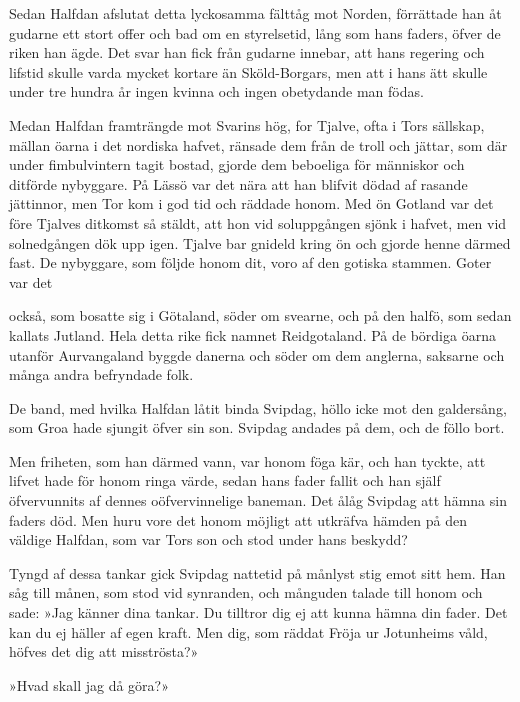 Sedan Halfdan afslutat detta lyckosamma fälttåg mot Norden, förrättade
han åt gudarne ett stort offer och bad om en styrelsetid, lång som hans
faders, öfver de riken han ägde. Det svar han fick från gudarne innebar,
att hans regering och lifstid skulle varda mycket kortare än
Sköld-Borgars, men att i hans ätt skulle under tre hundra år ingen
kvinna och ingen obetydande man födas.

Medan Halfdan framträngde mot Svarins hög, for Tjalve, ofta i Tors
sällskap, mällan öarna i det nordiska hafvet, ränsade dem från de troll
och jättar, som där under fimbulvintern tagit bostad, gjorde dem
beboeliga för människor och ditförde nybyggare. På Lässö var det nära
att han blifvit dödad af rasande jättinnor, men Tor kom i god tid och
räddade honom. Med ön Gotland var det före Tjalves ditkomst så stäldt,
att hon vid soluppgången sjönk i hafvet, men vid solnedgången dök upp
igen. Tjalve bar gnideld kring ön och gjorde henne därmed fast. De
nybyggare, som följde honom dit, voro af den gotiska stammen. Goter var
det

också, som bosatte sig i Götaland, söder om svearne, och på den halfö,
som sedan kallats Jutland. Hela detta rike fick namnet Reidgotaland. På
de bördiga öarna utanför Aurvangaland byggde danerna och söder om dem
anglerna, saksarne och många andra befryndade folk.



De band, med hvilka Halfdan låtit binda Svipdag, höllo icke mot den
galdersång, som Groa hade sjungit öfver sin son. Svipdag andades på dem,
och de föllo bort.

Men friheten, som han därmed vann, var honom föga kär, och han tyckte,
att lifvet hade för honom ringa värde, sedan hans fader fallit och han
själf öfvervunnits af dennes oöfvervinnelige baneman. Det ålåg Svipdag
att hämna sin faders död. Men huru vore det honom möjligt att utkräfva
hämden på den väldige Halfdan, som var Tors son och stod under hans
beskydd?

Tyngd af dessa tankar gick Svipdag nattetid på månlyst stig emot sitt
hem. Han såg till månen, som stod vid synranden, och månguden talade
till honom och sade: »Jag känner dina tankar. Du tilltror dig ej att
kunna hämna din fader. Det kan du ej häller af egen kraft. Men dig, som
räddat Fröja ur Jotunheims våld, höfves det dig att misströsta?»

»Hvad skall jag då göra?»

